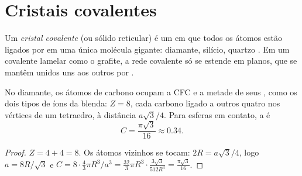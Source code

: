 \section{Cristais covalentes}

\begin{definition}\label{def:b1:crystals-ionic-covalent:covalent-crystal}
Um \emph{cristal covalente} (ou sólido
reticular) é um  em que todos os átomos estão ligados por
 em uma única molécula gigante: diamante, silício,
quartzo . Em um  covalente lamelar como o grafite, a
rede covalente só se estende em planos, que se mantêm unidos uns aos
outros por .
\end{definition}

\begin{proposition}\label{prop:b1:crystals-ionic-covalent:diamond}
No diamante, os átomos de carbono ocupam a  CFC e a metade de seus
, como os dois tipos de íons da blenda: $Z = 8$, cada
carbono ligado a outros quatro nos vértices de um tetraedro, à
distância $a\sqrt3/4$. Para esferas em contato, a  é
\[
  C = \frac{\pi\sqrt3}{16} \approx 0.34 .
\]
\end{proposition}

\begin{proof}
$Z = 4 + 4 = 8$. Os átomos vizinhos se tocam: $2R = a\sqrt3/4$, logo $a =
8R/\sqrt3$ e $C = 8 \cdot \frac43\pi R^3/a^3 = \frac{32}{3}\pi R^3 \cdot
\frac{3\sqrt3}{512 R^3} = \frac{\pi\sqrt3}{16}$.
\end{proof}

